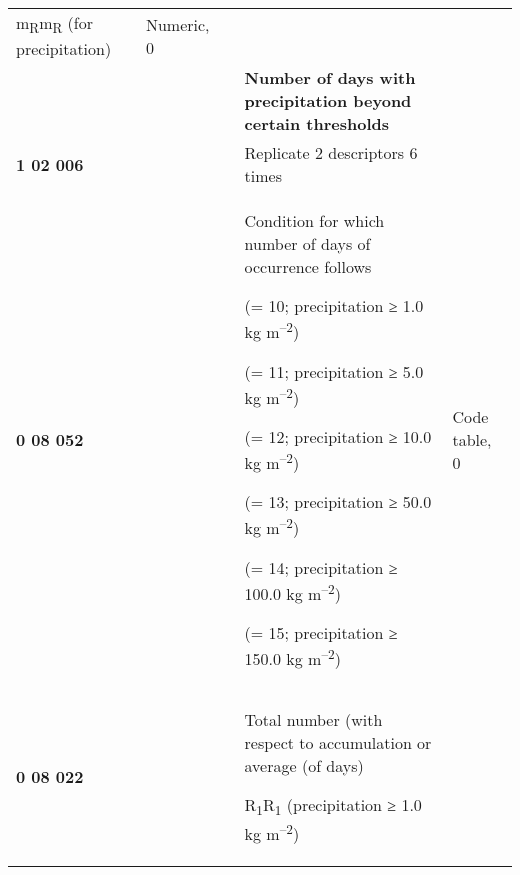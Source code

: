 \begin{longtable}[]{@{}lllll@{}}
\begin{minipage}[t]{0.17\columnwidth}
m\textsubscript{R}m\textsubscript{R} (for precipitation)\strut
\end{minipage} & \begin{minipage}[t]{0.17\columnwidth}\raggedright
Numeric, 0\strut
\end{minipage}\tabularnewline
& & & \textbf{Number of days with precipitation beyond certain thresholds} &\tabularnewline
\textbf{1 02 006} & & & Replicate 2 descriptors 6 times &\tabularnewline
\begin{minipage}[t]{0.17\columnwidth}\raggedright
\textbf{0 08 052}\strut
\end{minipage} & \begin{minipage}[t]{0.17\columnwidth}\raggedright
\strut
\end{minipage} & \begin{minipage}[t]{0.17\columnwidth}\raggedright
\strut
\end{minipage} & \begin{minipage}[t]{0.17\columnwidth}\raggedright
Condition for which number of days of occurrence follows

(= 10; precipitation ≥ 1.0 kg m\textsuperscript{--2})

(= 11; precipitation ≥ 5.0 kg m\textsuperscript{--2})

(= 12; precipitation ≥ 10.0 kg m\textsuperscript{--2})

(= 13; precipitation ≥ 50.0 kg m\textsuperscript{--2})

(= 14; precipitation ≥ 100.0 kg m\textsuperscript{--2})

(= 15; precipitation ≥ 150.0 kg m\textsuperscript{--2})\strut
\end{minipage} & \begin{minipage}[t]{0.17\columnwidth}\raggedright
Code table, 0\strut
\end{minipage}\tabularnewline
\begin{minipage}[t]{0.17\columnwidth}\raggedright
\textbf{0 08 022}\strut
\end{minipage} & \begin{minipage}[t]{0.17\columnwidth}\raggedright
\strut
\end{minipage} & \begin{minipage}[t]{0.17\columnwidth}\raggedright
\strut
\end{minipage} & \begin{minipage}[t]{0.17\columnwidth}\raggedright
Total number (with respect to accumulation or average (of days)

R\textsubscript{1}R\textsubscript{1} (precipitation ≥ 1.0 kg m\textsuperscript{--2})


\end{minipage}
\end{longtable}
